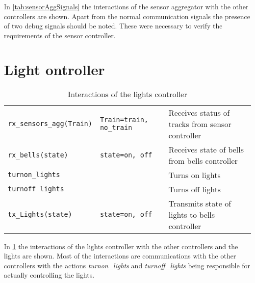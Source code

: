 \documentclass[final]{report}
\begin{document}
In \cref{tab:sensorAggSignals} the interactions of the sensor aggregator with the other controllers are shown.
Apart from the normal communication signals the presence of two debug signals should be noted.
These were necessary to verify the requirements of the sensor controller.

\section{Light ontroller}
\begin{table}[H]
\centering
    \begin{tabular}{|l|l|l|}
    \hline
    \texttt{rx\_sensors\_agg(Train)} & \texttt{Train=train, no\_train} & Receives status of tracks from sensor controller \\
    \texttt{rx\_bells(state)}        & \texttt{state=on, off}          & Receives state of bells from bells controller    \\ \hline
    \texttt{turnon\_lights}          &                                 & Turns on lights                                  \\
    \texttt{turnoff\_lights}         &                                 & Turns off lights                                 \\
    \texttt{tx\_Lights(state)}       & \texttt{state=on, off}          & Transmits state of lights to bells controller    \\ \hline
    \end{tabular}
\caption{Interactions of the lights controller}
\label{tab:lightsSignals}
\end{table}

In \cref{tab:lightsSignals} the interactions of the lights controller with the other controllers and the lights are shown.
Most of the interactions are communications with the other controllers with the actions \textit{turnon\_lights} and \textit{turnoff\_lights} being responsible for actually controlling the lights.
\end{document}
